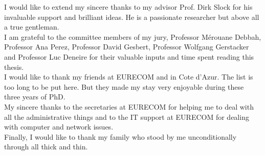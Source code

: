 

I would like to extend my sincere thanks to my advisor Prof. Dirk Slock for his invaluable support and brilliant ideas. He is a passionate researcher but above all a true gentleman.
\\

I am grateful to the committee members of my jury, Professor M\'erouane Debbah, Professor Ana Perez, Professor David Gesbert, Professor Wolfgang Gerstacker and Professor Luc Deneire for their valuable inputs and time spent reading this thesis. 
\\

I would like to thank my friends at EURECOM and in Cote d'Azur. The list is too long to be put here. But they made my stay very enjoyable during these three years of PhD. \\

My sincere thanks to the secretaries at EURECOM for helping me to deal with all the administrative things and to the IT support at EURECOM for dealing with computer and network issues. 
\\

Finally, I would like to thank my family who stood by me unconditionally through all thick and thin.
